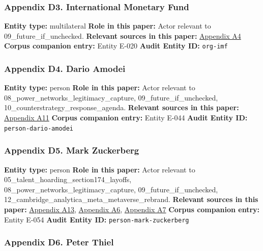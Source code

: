 \documentclass[
  american,
  11pt,
  letterpaper,
]{article}
\begin{document}
\subsubsection{Appendix D3. International Monetary
Fund}\label{appendix-d3-international-monetary-fund}

\textbf{Entity type:} multilateral \textbf{Role in this paper:} Actor
relevant to 09\_future\_if\_unchecked. \textbf{Relevant sources in this
paper:}
\hyperref[appendix-a4-gen-ai-artificial-intelligence-and-the-future-of-work]{Appendix
A4} \textbf{Corpus companion entry:} Entity E-020 \textbf{Audit Entity
ID:} \texttt{org-imf}

\subsubsection{Appendix D4. Dario
Amodei}\label{appendix-d4-dario-amodei}

\textbf{Entity type:} person \textbf{Role in this paper:} Actor relevant
to 08\_power\_networks\_legitimacy\_capture, 09\_future\_if\_unchecked,
10\_counterstrategy\_response\_agenda. \textbf{Relevant sources in this
paper:} \hyperref[appendix-a11-the-adolescence-of-technology]{Appendix
A11} \textbf{Corpus companion entry:} Entity E-044 \textbf{Audit Entity
ID:} \texttt{person-dario-amodei}

\subsubsection{Appendix D5. Mark
Zuckerberg}\label{appendix-d5-mark-zuckerberg}

\textbf{Entity type:} person \textbf{Role in this paper:} Actor relevant
to 05\_talent\_hoarding\_section174\_layoffs,
08\_power\_networks\_legitimacy\_capture, 09\_future\_if\_unchecked,
12\_cambridge\_analytica\_meta\_metaverse\_rebrand. \textbf{Relevant
sources in this paper:}
\hyperref[appendix-a13-mark-zuckerberg-s-message-to-meta-employees]{Appendix
A13},
\hyperref[appendix-a6-inside-mark-zuckerbergs-top-secret-hawaii-compound]{Appendix
A6},
\hyperref[appendix-a7-mark-zuckerberg-downplays-his-5-000-square-foot-underground-bunker-in-hawaii-just-a-little-shelter]{Appendix
A7} \textbf{Corpus companion entry:} Entity E-054 \textbf{Audit Entity
ID:} \texttt{person-mark-zuckerberg}

\subsubsection{Appendix D6. Peter Thiel}\label{appendix-d6-peter-thiel}
\end{document}
